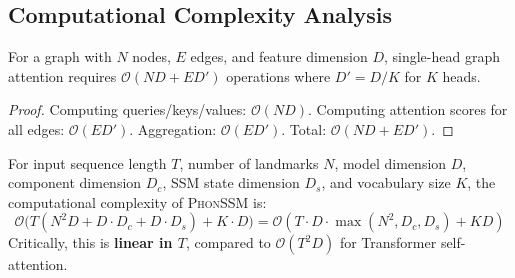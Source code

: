 \documentclass{article}
\newcommand{\phonssm}{\textsc{PhonSSM}}
\begin{document}
\subsection{Computational Complexity Analysis}

\begin{lemma}
\label{lemma:gat_complexity}
For a graph with $N$ nodes, $E$ edges, and feature dimension $D$, single-head graph attention requires $\mathcal{O}(ND + ED')$ operations where $D' = D/K$ for $K$ heads.
\end{lemma}

\begin{proof}
Computing queries/keys/values: $\mathcal{O}(ND)$. Computing attention scores for all edges: $\mathcal{O}(ED')$. Aggregation: $\mathcal{O}(ED')$. Total: $\mathcal{O}(ND + ED')$.
\end{proof}

\begin{theorem}
\label{thm:complexity}
For input sequence length $T$, number of landmarks $N$, model dimension $D$, component dimension $D_c$, SSM state dimension $D_s$, and vocabulary size $K$, the computational complexity of \phonssm{} is:
\begin{equation}
\mathcal{O}\big(T(N^2 D + D \cdot D_c + D \cdot D_s) + K \cdot D\big) = \mathcal{O}(T \cdot D \cdot \max(N^2, D_c, D_s) + KD)
\end{equation}
Critically, this is \textbf{linear in $T$}, compared to $\mathcal{O}(T^2 D)$ for Transformer self-attention.
\end{theorem}
\end{document}
